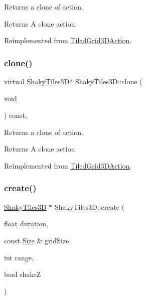 Returns a clone of action.

\begin{DoxyReturn}{Returns}
A clone action. 
\end{DoxyReturn}


Reimplemented from \hyperlink{classTiledGrid3DAction_a689fd377cc0abae91db7def106529b53}{Tiled\+Grid3\+D\+Action}.

\mbox{\label{classShakyTiles3D_aefe37a5cda9d6898ad9c573e5a220ce1}} 
\subsubsection{\texorpdfstring{clone()}{clone()}\hspace{0.1cm}{\footnotesize\ttfamily [2/2]}}
{\footnotesize\ttfamily virtual \hyperlink{classShakyTiles3D}{Shaky\+Tiles3D}$\ast$ Shaky\+Tiles3\+D\+::clone (\begin{DoxyParamCaption}\item[{void}]{ }\end{DoxyParamCaption}) const\hspace{0.3cm}{\ttfamily [override]}, {\ttfamily [virtual]}}

Returns a clone of action.

\begin{DoxyReturn}{Returns}
A clone action. 
\end{DoxyReturn}


Reimplemented from \hyperlink{classTiledGrid3DAction_a689fd377cc0abae91db7def106529b53}{Tiled\+Grid3\+D\+Action}.

\mbox{\label{classShakyTiles3D_a5c2c177b5795f1d9137734c6849bead8}} 
\subsubsection{\texorpdfstring{create()}{create()}\hspace{0.1cm}{\footnotesize\ttfamily [1/2]}}
{\footnotesize\ttfamily \hyperlink{classShakyTiles3D}{Shaky\+Tiles3D} $\ast$ Shaky\+Tiles3\+D\+::create (\begin{DoxyParamCaption}\item[{float}]{duration,  }\item[{const \hyperlink{classSize}{Size} \&}]{grid\+Size,  }\item[{int}]{range,  }\item[{bool}]{shakeZ }\end{DoxyParamCaption})\hspace{0.3cm}{\ttfamily [static]}}



